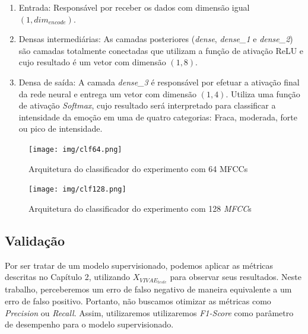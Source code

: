 \begin{enumerate}
    \item Entrada: Responsável por receber os dados com dimensão igual $(1, dim_{encode})$.
    \item Densas intermediárias: As camadas posteriores (\textit{dense}, \textit{dense\_1} e \textit{dense\_2}) são camadas totalmente conectadas que utilizam a função de ativação \acrshort{ReLU} e cujo resultado é um vetor com dimensão $(1, 8)$.
    \item Densa de saída: A camada \textit{dense\_3} é responsável por efetuar a ativação final da rede neural e entrega um vetor com dimensão $(1, 4)$. Utiliza uma função de ativação \textit{Softmax}, cujo resultado será interpretado para classificar a intensidade da emoção em uma de quatro categorias: Fraca, moderada, forte ou pico de intensidade.
\end{enumerate}

\begin{figure}[]
    \centering
    \begin{minipage}[b]{0.45\linewidth}
        \centering
        \texttt{[image: img/clf64.png]}
        \caption{\label{fig:clf64}Arquitetura do classificador do experimento com 64 \acrshort{MFCC}s}
    \end{minipage}
    \begin{minipage}[b]{0.45\linewidth}
    \centering
        \texttt{[image: img/clf128.png]}
        \caption{\label{fig:clf128}Arquitetura do classificador do experimento com 128 \textit{MFCC}s}
    \end{minipage}
\end{figure}


\subsection{Validação}

Por ser tratar de um modelo supervisionado, podemos aplicar as métricas descritas no Capítulo 2, utilizando $X_{VIVAE_{teste}}$ para observar seus resultados. Neste trabalho, perceberemos um erro de  falso negativo de maneira equivalente a um erro de falso positivo. Portanto, não buscamos otimizar as métricas como \textit{Precision} ou \textit{Recall}. Assim, utilizaremos utilizaremos \textit{F1-Score} como parâmetro de desempenho para o modelo supervisionado.
